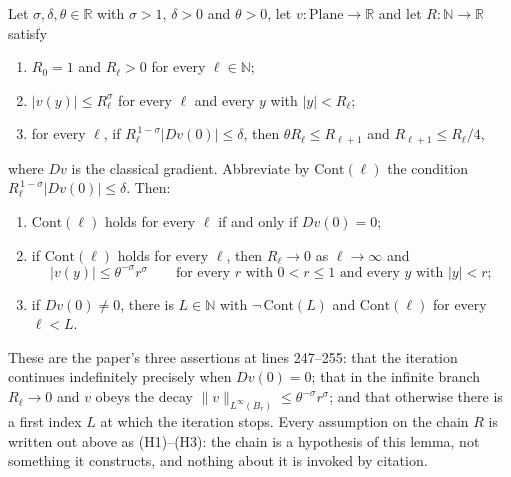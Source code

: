 \begin{lemma}
Let $\sigma,\delta,\theta\in\mathbb{R}$ with $\sigma>1$, $\delta>0$ and $\theta>0$, let
$v\colon\mathrm{Plane}\to\mathbb{R}$ and let $R\colon\mathbb{N}\to\mathbb{R}$ satisfy
\begin{enumerate}
\item[(H1)] $R_0=1$ and $R_\ell>0$ for every $\ell\in\mathbb{N}$;
\item[(H2)] $\lvert v(y)\rvert\le R_\ell^{\sigma}$ for every $\ell$ and every $y$ with
  $\lvert y\rvert<R_\ell$;
\item[(H3)] for every $\ell$, if $R_\ell^{\,1-\sigma}\lvert Dv(0)\rvert\le\delta$, then
  $\theta R_\ell\le R_{\ell+1}$ and $R_{\ell+1}\le R_\ell/4$,
\end{enumerate}
where $Dv$ is the classical gradient.  Abbreviate by $\mathrm{Cont}(\ell)$ the condition
$R_\ell^{\,1-\sigma}\lvert Dv(0)\rvert\le\delta$.  Then:
\begin{enumerate}
\item $\mathrm{Cont}(\ell)$ holds for every $\ell$ if and only if $Dv(0)=0$;
\item if $\mathrm{Cont}(\ell)$ holds for every $\ell$, then $R_\ell\to0$ as $\ell\to\infty$ and
\[
  \lvert v(y)\rvert\le\theta^{-\sigma}r^{\sigma}
  \qquad\text{for every }r\text{ with }0<r\le1\text{ and every }y\text{ with }
  \lvert y\rvert<r;
\]
\item if $Dv(0)\ne0$, there is $L\in\mathbb{N}$ with $\neg\,\mathrm{Cont}(L)$ and
  $\mathrm{Cont}(\ell)$ for every $\ell<L$.
\end{enumerate}

These are the paper's three assertions at lines 247--255: that the iteration continues
indefinitely precisely when $Dv(0)=0$; that in the infinite branch $R_\ell\to0$ and $v$ obeys
the decay $\lVert v\rVert_{L^{\infty}(B_r)}\le\theta^{-\sigma}r^{\sigma}$; and that otherwise
there is a first index $L$ at which the iteration stops.  Every assumption on the chain $R$ is
written out above as (H1)--(H3): the chain is a hypothesis of this lemma, not something it
constructs, and nothing about it is invoked by citation.
\end{lemma}
